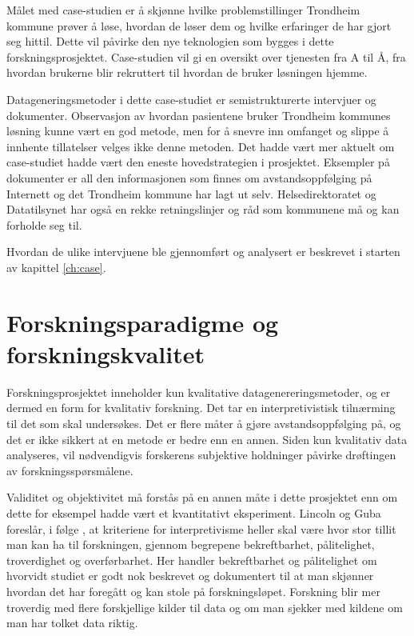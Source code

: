 Målet med case-studien er å skjønne hvilke problemstillinger Trondheim kommune prøver å løse, hvordan de løser dem og hvilke
erfaringer de har gjort seg hittil. Dette vil påvirke den nye teknologien som bygges i dette forskningsprosjektet. Case-studien
vil gi en oversikt over tjenesten fra A til Å, fra hvordan brukerne blir rekruttert til hvordan de bruker løsningen hjemme.

Datageneringsmetoder i dette case-studiet er semistrukturerte intervjuer og dokumenter. Observasjon av hvordan pasientene bruker Trondheim kommunes løsning
kunne vært en god metode, men for å snevre inn omfanget og slippe å innhente tillatelser velges ikke denne metoden. Det hadde vært mer
aktuelt om case-studiet hadde vært den eneste hovedstrategien i prosjektet. Eksempler på dokumenter er all den informasjonen som finnes om
avstandsoppfølging på Internett og det Trondheim kommune har lagt ut selv. Helsedirektoratet og Datatilsynet
har også en rekke retningslinjer og råd som kommunene må og kan forholde seg til.

Hvordan de ulike intervjuene ble gjennomført og analysert er beskrevet i starten av kapittel \ref{ch:case}.

\section{Forskningsparadigme og forskningskvalitet}
Forskningsprosjektet inneholder kun kvalitative datagenereringsmetoder, og er dermed en form for kvalitativ forskning.
Det tar en interpretivistisk tilnærming til det som skal undersøkes. Det er flere måter å gjøre avstandsoppfølging på,
og det er ikke sikkert at en metode er bedre enn en annen.
Siden kun kvalitativ data analyseres, vil nødvendigvis forskerens subjektive holdninger påvirke drøftingen av forskningsspørsmålene.

Validitet og objektivitet må forstås på en annen måte i dette prosjektet enn om dette for eksempel hadde vært et
kvantitativt eksperiment. Lincoln og Guba foreslår, i følge \citet{oates},
at kriteriene for interpretivisme
heller skal være hvor stor tillit man kan ha til forskningen, gjennom begrepene bekreftbarhet, pålitelighet, troverdighet og overførbarhet.
Her handler bekreftbarhet og pålitelighet om hvorvidt studiet er godt nok beskrevet og dokumentert til at man skjønner hvordan det har
foregått og kan stole
på forskningsløpet. Forskning blir mer troverdig med flere forskjellige kilder til data og om man sjekker med kildene om man har
tolket data riktig.

